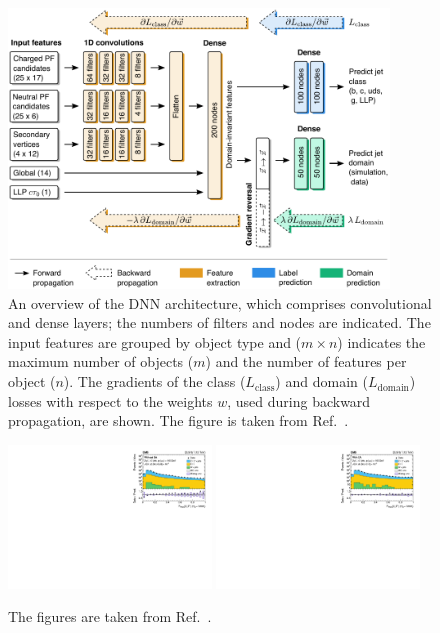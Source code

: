 \documentclass{webofc}
\begin{document}
\begin{figure}[!ht]
\includegraphics[width=0.9\textwidth]{figs/network.pdf}
\centering
\caption{An overview of the DNN architecture, which comprises convolutional and dense layers; the numbers of filters and nodes are indicated. The input features are grouped by object type and ($m\times n$) indicates the maximum number of objects ($m$) and the number of features per object ($n$). The gradients of the class ($L_\textrm{class}$) and domain ($L_\textrm{domain}$) losses with respect to the weights $w$, used during backward propagation, are shown. The figure is taken from Ref.~\cite{CMS-EXO-19-011}.}
\label{arch}
\end{figure}

\begin{figure}[!ht]
\includegraphics[width=0.48\textwidth]{figs/2mu_2toNj__llpdnnx_noda_0_max_highpt.pdf}\hspace{0.03\textwidth}
\includegraphics[width=0.48\textwidth]{figs/2mu_2toNj__llpdnnx_da_0_max_highpt.pdf}
\centering
\caption{The figures are taken from Ref.~\cite{CMS-EXO-19-011}.}
\label{fig-3}
\end{figure}
\end{document}

